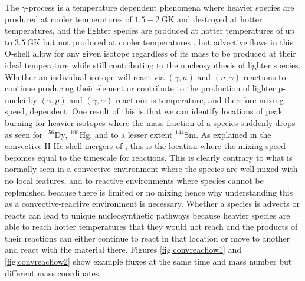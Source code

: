 The $\gamma$-process is a temperature dependent phenomena where heavier species are produced at cooler temperatures of $1.5-2~\mathrm{GK}$ and destroyed at hotter temperatures, and the lighter species are produced at hotter temperatures of up to $3.5~\mathrm{GK}$ but not produced at cooler temperatures \citep{rauscherConstrainingAstrophysicalOrigin2013}, but advective flows in this O-shell allow for any given isotope regardless of its mass to be produced at their ideal temperature while still contributing to the nucleosynthesis of lighter species.
Whether an individual isotope will react via $(\gamma,n)$ and $(n,\gamma)$ reactions to continue producing their element or contribute to the production of lighter p-nuclei by  $(\gamma,p)$ and $(\gamma,\alpha)$ reactions is temperature, and therefore mixing speed, dependent.
One result of this is that we can identify locations of peak burning for heavier isotopes where the mass fraction of a species suddenly drops as seen for $^{156}\mathrm{Dy}$, $^{196}\mathrm{Hg}$, and to a lesser extent $^{144}\mathrm{Sm}$.
As explained in the convective H-He shell mergers of \cite{herwigCONVECTIVEREACTIVEPROTON2011}, this is the location where the mixing speed becomes equal to the timescale for reactions.  
This is clearly contrary to what is normally seen in a convective environment where the species are well-mixed with no local features, and to reactive environments where species cannot be replenished because there is limited or no mixing hence why understanding this as a convective-reactive environment is necessary.
Whether a species is advects or reacts can lead to unique nucleosynthetic pathways because heavier species are able to reach hotter temperatures that they would not reach and the products of their reactions can either continue to react in that location or move to another and react with the material there.
Figures \ref{fig:convreacflow1} and \ref{fig:convreacflow2} show example fluxes at the same time and mass number but different mass coordinates.

